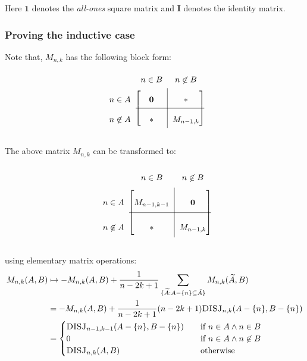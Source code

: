 \documentclass[usletter]{article}
\newcommand {\mat}[1]  {\ensuremath{\mathbf{#1}}}
\newcommand {\function}[2]  {\ensuremath{\textsc{#1}_{#2}}}
\newcommand {\DISJ}[2]      {\function{DISJ}{#1,#2}}
\begin{document}
\noindent
Here \mat{1} denotes the \textit{all-ones} square matrix and \mat{I} denotes the identity matrix.

\subsubsection*{Proving the inductive case}

Note that, $M_{n,k}$ has the following block form:
$$ \arraycolsep=1.45pt \def\arraystretch{2}
  \begin{blockarray}{ccc}
    & n \in B & n \not\in B \\
    \begin{block}{c[c|c]}
      n \in A   & \mat{0} & * \\
      \cline{2-3}
      n \not\in A & * & M_{n-1,k} \\
    \end{block}
  \end{blockarray}
$$

\noindent
The above matrix $M_{n,k}$ can be transformed to:
$$ \arraycolsep=1.6pt \def\arraystretch{2.5}
  \begin{blockarray}{ccc}
    & n \in B & n \not\in B \\
    \begin{block}{c[c|c]}
      n \in A     & M_{n-1,k-1} & \mat{0} \\
      \cline{2-3}
      n \not\in A & * & M_{n-1,k} \\
    \end{block}
  \end{blockarray}
$$

\noindent
using elementary matrix operations:
\begin{align*}
M_{n,k}(A,B) &\mapsto -M_{n,k}(A,B) + \frac{1}{n - 2k + 1}
                                     \sum_{\{\widetilde{A} : A - \{n\} \subseteq \tilde{A}\}} {M_{n,k}(\widetilde{A},B)} \\
             &= -M_{n,k}(A,B) + \frac{1}{n - 2k + 1}
                                (n - 2k + 1)\DISJ{n}{k}(A-\{n\}, B-\{n\}) \\
             &= \begin{cases}
                  \DISJ{n-1}{k-1}(A-\{n\}, B-\{n\})
                        &\quad \text{if } n \in A \wedge n \in B \\
                  0
                        &\quad \text{if } n \in A \wedge n \not\in B \\
                  \DISJ{n}{k}(A, B)
                        &\quad \text{otherwise}
                \end{cases}
\end{align*}
\end{document}
